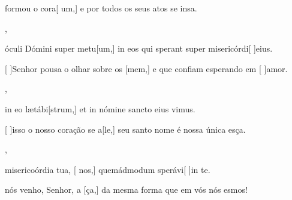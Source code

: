 {        {\item {} formou o cora[ um,] e por todos os seus atos se insa.},
    {\item {} óculi Dómini super metu[um,] in eos qui sperant super misericórdi[ ]{e}ius.}%
        {\item {}[ ]{Se}nhor pousa o olhar sobre os [mem,] e que confiam esperando em [ ]{a}mor.},
    {\item {} in eo lætábi[strum,] et in nómine sancto eius vimus.}%
        {\item {}[ ]{is}so o nosso coração se a[le,] seu santo nome é nossa única esça.},
    {\item {} misericoórdia tua, [ nos,] quemádmodum sperávi[ ]{in} te.}%
        {\item {} nós venho, Senhor, a [ça,] da mes\-ma forma que em vós nós esmos!}
}